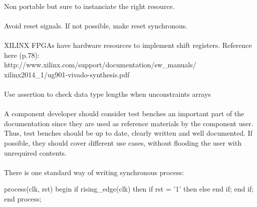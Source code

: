 \documentclass[12pt]{article}
\begin{document}
\paragraph{}
Non portable but sure to instanciate the right resource.


\paragraph{}
Avoid reset signals. If not possible, make reset synchronous.


\paragraph{}
XILINX FPGAs have hardware resources to implement shift registers.
Reference here (p.78):\\
\longurl
{http://www.xilinx.com/support/documentation/sw_manuals/}
{xilinx2014_1/ug901-vivado-synthesis.pdf}



\paragraph{}
Use assertion to check data type lengths when unconstraints
arrays



\paragraph{}
A component developer should consider test benches an important
part of the documentation since they are used as reference
materials by the component user. Thus, test benches should be up
to date, clearly written and well documented. If possible, they
should cover different use cases, without flooding the user with
unrequired contents.



\paragraph{}
There is one standard way of writing synchronous process:
\begin{vhdl}
process(clk, rst)
begin
 if rising_edge(clk) then
  if rst = '1' then
  else
  end if;
 end if;
end process;
\end{vhdl}
\end{document}
